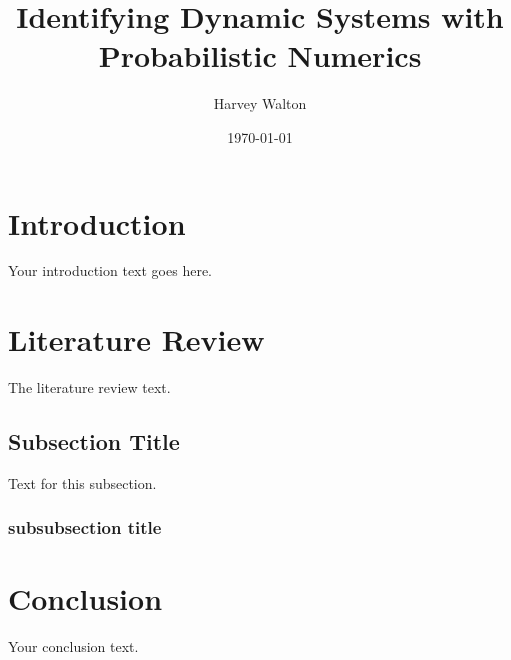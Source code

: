 \documentclass[12pt]{article}
\title{Identifying Dynamic Systems with Probabilistic Numerics}
\author{Harvey Walton}
\date{\today}
\begin{document}
    

    \section{Introduction}
    Your introduction text goes here.

    \section{Literature Review}
    The literature review text.

    \subsection{Subsection Title}
    Text for this subsection.

    \subsubsection{subsubsection title}


    \section{Conclusion}
    Your conclusion text.

    \printbibliography
\end{document}
